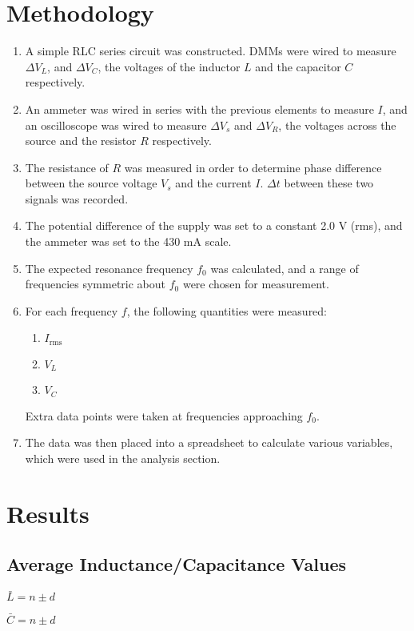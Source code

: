 \documentclass[twocolumn,english]{IEEEtran}
\theoremstyle{plain}
\theoremstyle{plain}
\begin{document}
\section{Methodology}
\begin{enumerate}
	\item A simple RLC series circuit was constructed. DMMs were wired to measure $\Delta V_L$, and $\Delta V_C$, the voltages of the inductor $L$ and the capacitor $C$ respectively.
	\item An ammeter was wired in series with the previous elements to measure $I$, and an oscilloscope was wired to measure $\Delta V_s$ and $\Delta V_R$, the voltages across the source and the resistor $R$ respectively.
	\item The resistance of $R$ was measured in order to determine phase difference between the source voltage $V_s$ and the current $I$. $\Delta t$ between these two signals was recorded.
	\item The potential difference of the supply was set to a constant 2.0 V (rms), and the ammeter was set to the 430 mA scale.
	\item The expected resonance frequency $f_0$ was calculated, and a range of frequencies symmetric about $f_0$ were chosen for measurement.
	\item For each frequency $f$, the following quantities were measured:
	\begin{enumerate}
		\item $I_{\text{rms}}$
		\item $V_L$
		\item $V_C$
	\end{enumerate}
	Extra data points were taken at frequencies approaching $f_0$.
	\item The data was then placed into a spreadsheet to calculate various variables, which were used in the analysis section.
\end{enumerate}

\section{Results}
\subsection{Average Inductance/Capacitance Values}

\underline{$\bar L = n\pm d$}

\underline{$\bar C = n\pm d$}

\hrulefill
\end{document}

